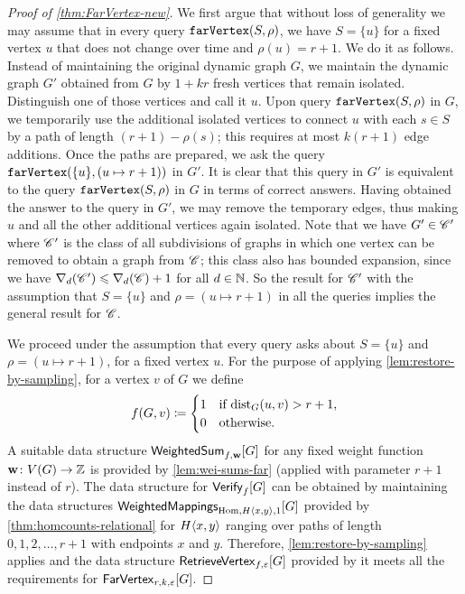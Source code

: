 \begin{proof}[Proof of \cref{thm:FarVertex-new}]
	We first argue that without loss of generality we may assume that in every query $\far{S,\rho}$, we have $S=\{u\}$ for a fixed vertex $u$ that does not change over time and $\rho(u)=r+1$. We do it as follows. Instead of maintaining the original dynamic graph $G$, we maintain the dynamic graph $G'$ obtained from $G$ by $1+kr$ fresh vertices that remain isolated. Distinguish one of those vertices and call it $u$. Upon query $\far{S,\rho}$ in $G$, we temporarily use the additional isolated vertices to connect $u$ with each $s\in S$ by a path of length $(r+1)-\rho(s)$; this requires at most $k(r+1)$ edge additions. Once the paths are prepared, we ask the query $\far{\{u\},(u\mapsto r+1)}$ in $G'$. It is clear that this query in $G'$ is equivalent to the query $\far{S,\rho}$ in $G$ in terms of correct answers. Having obtained the answer to the query in $G'$, we may remove the temporary edges, thus making $u$ and all the other additional vertices again isolated. Note that we have $G'\in \Cc'$ where $\Cc'$ is the class of all subdivisions of graphs in which one vertex can be removed to obtain a graph from $\Cc$; this class also has bounded expansion, since we have $\nabla_d(\Cc')\leq \nabla_d(\Cc)+1$ for all $d\in \N$. So the result for $\Cc'$ with the assumption that $S=\{u\}$ and $\rho=(u\mapsto r+1)$ in all the queries implies the general result for $\Cc$.
	
	We proceed under the assumption that every query asks about $S=\{u\}$ and $\rho=(u\mapsto r+1)$, for a fixed vertex $u$.
	For the purpose of applying \cref{lem:restore-by-sampling}, for a vertex $v$ of $G$ we define
	\[f(G,v)\coloneqq \begin{cases} 1 &\textrm{if }\dist_G(u,v)>r+1,\\ 0 & \textrm{otherwise.}\end{cases}\]
	A suitable data structure $\WeiSum_{f, \wei}[G]$ for any fixed weight function $\wei\colon V(G)\to \Z$ is provided by \cref{lem:wei-sums-far} (applied with parameter $r+1$ instead of $r$). The data structure for $\Ver_f[G]$ can be obtained by maintaining the data structures $\WeiMaps_{\Hom,\rt{H}{x,y},1}[G]$ provided by \cref{thm:homcounts-relational} for $\rt{H}{x,y}$ ranging over paths of length $0,1,2,\ldots,r+1$ with endpoints $x$ and $y$. Therefore, \cref{lem:restore-by-sampling} applies and the data structure $\mathsf{RetrieveVertex}_{f,\eps}[G]$ provided by it meets all the requirements for $\farVertexDS{G}{r,k,\eps}$.
\end{proof}

